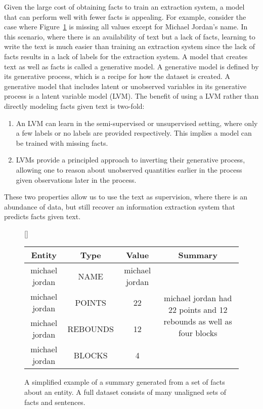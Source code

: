 \documentclass[12pt]{article}
\begin{document}
Given the large cost of obtaining facts to train an extraction system,
a model that can perform well with fewer facts is appealing.
For example, consider the case where Figure~\ref{fig:boxscore} is missing all values except for 
Michael Jordan's name.
In this scenario, where there is an availability of text but a lack of facts,
learning to write the text is much easier than training an extraction system
since the lack of facts results in a lack of labels for the extraction system.
A model that creates text as well as facts is called a generative model.
A generative model is defined by its generative process, which 
is a recipe for how the dataset is created.
A generative model that includes latent or unobserved variables in its generative process
is a latent variable model (LVM).
The benefit of using a LVM rather than directly modeling facts given text is two-fold:
\begin{enumerate}
\item An LVM can learn in the semi-supervised or unsupervised setting,
where only a few labels or no labels are provided respectively.
This implies a model can be trained with missing facts.
\item LVMs provide a principled approach to inverting their generative process,
allowing one to reason about unobserved quantities earlier in the process given
observations later in the process. 
\end{enumerate}
These two properties allow us to use the text as supervision,
where there is an abundance of data, but still recover an information extraction system that predicts facts
given text.

\begin{figure}[t]
\centering
{}[\FBwidth]
{\caption{A simplified example of a summary generated from a set of facts about an entity.
A full dataset consists of many unaligned sets of facts and sentences.}
\label{fig:boxscore}}
{\small\begin{tabular}{ccc|c}
\toprule
Entity & Type & Value & Summary\\
\midrule
michael jordan & NAME & michael jordan &
\multirow{4}{*}{\parbox{4cm}{michael jordan had 22 points and 12 rebounds as well as four blocks}}\\
michael jordan & POINTS & 22 &\\
michael jordan & REBOUNDS & 12 & \\
michael jordan & BLOCKS & 4 &\\
\bottomrule
\end{tabular}}
\end{figure}
\end{document}
